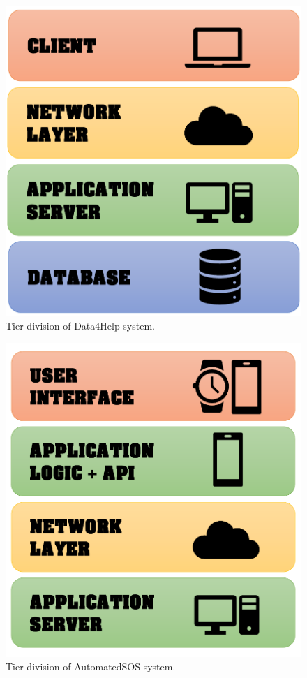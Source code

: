 \documentclass[a4paper]{article}
\begin{document}
\begin{figure}[H]
    \centering
    \includegraphics[width=\linewidth]{Data4Help-tier-division}
    \caption{Tier division of Data4Help system.}
    \label{fig:my_label}
\end{figure}

\begin{figure}[H]
    \centering
    \includegraphics[width=\linewidth]{AutomatedSOS-tier-division}
    \caption{Tier division of AutomatedSOS system.}
    \label{fig:my_label}
\end{figure}
\end{document}
